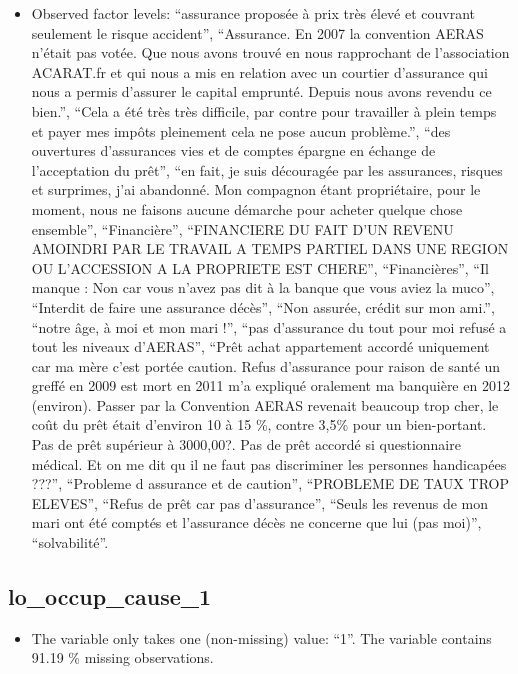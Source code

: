 \documentclass[
  letterpaper,
  DIV=11,
  numbers=noendperiod]{scrartcl}
\providecommand{\tightlist}{%
  \setlength{\itemsep}{0pt}\setlength{\parskip}{0pt}}
\begin{document}
\begin{itemize}
\tightlist
\item
  Observed factor levels: ``assurance proposée à prix très élevé et
  couvrant seulement le risque accident'', ``Assurance. En 2007 la
  convention AERAS n'était pas votée. Que nous avons trouvé en nous
  rapprochant de l'association ACARAT.fr et qui nous a mis en relation
  avec un courtier d'assurance qui nous a permis d'assurer le capital
  emprunté. Depuis nous avons revendu ce bien.'', ``Cela a été très très
  difficile, par contre pour travailler à plein temps et payer mes
  impôts pleinement cela ne pose aucun problème.'', ``des ouvertures
  d'assurances vies et de comptes épargne en échange de l'acceptation du
  prêt'', ``en fait, je suis découragée par les assurances, risques et
  surprimes, j'ai abandonné. Mon compagnon étant propriétaire, pour le
  moment, nous ne faisons aucune démarche pour acheter quelque chose
  ensemble'', ``Financière'', ``FINANCIERE DU FAIT D'UN REVENU AMOINDRI
  PAR LE TRAVAIL A TEMPS PARTIEL DANS UNE REGION OU L'ACCESSION A LA
  PROPRIETE EST CHERE'', ``Financières'', ``Il manque : Non car vous
  n'avez pas dit à la banque que vous aviez la muco'', ``Interdit de
  faire une assurance décès'', ``Non assurée, crédit sur mon ami.'',
  ``notre âge, à moi et mon mari !'', ``pas d'assurance du tout pour moi
  refusé a tout les niveaux d'AERAS'', ``Prêt achat appartement accordé
  uniquement car ma mère c'est portée caution. Refus d'assurance pour
  raison de santé un greffé en 2009 est mort en 2011 m'a expliqué
  oralement ma banquière en 2012 (environ). Passer par la Convention
  AERAS revenait beaucoup trop cher, le coût du prêt était d'environ 10
  à 15 \%, contre 3,5\% pour un bien-portant. Pas de prêt supérieur à
  3000,00?. Pas de prêt accordé si questionnaire médical. Et on me dit
  qu il ne faut pas discriminer les personnes handicapées ???'',
  ``Probleme d assurance et de caution'', ``PROBLEME DE TAUX TROP
  ELEVES'', ``Refus de prêt car pas d'assurance'', ``Seuls les revenus
  de mon mari ont été comptés et l'assurance décès ne concerne que lui
  (pas moi)'', ``solvabilité''.
\end{itemize}

\fullline

\subsection{lo\_occup\_cause\_1}\label{lo_occup_cause_1}

\begin{itemize}
\tightlist
\item
  The variable only takes one (non-missing) value: ``1''. The variable
  contains 91.19 \% missing observations.
\end{itemize}
\end{document}
